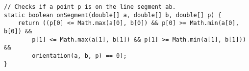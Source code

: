 \begin{verbatim}
// Checks if a point p is on the line segment ab.
static boolean onSegment(double[] a, double[] b, double[] p) {
	return ((p[0] <= Math.max(a[0], b[0]) && p[0] >= Math.min(a[0], b[0]) &&
    	p[1] <= Math.max(a[1], b[1]) && p[1] >= Math.min(a[1], b[1])) &&
        orientation(a, b, p) == 0);
}
\end{verbatim}
